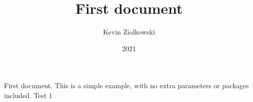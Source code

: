 \documentclass[12pt]{article}
\title{First document}
\author{Kevin Ziolkowski}
\date{2021}
\begin{document}
First document. This is a simple example, with no 
extra parameters or packages included.
Test 1
\end{document}
